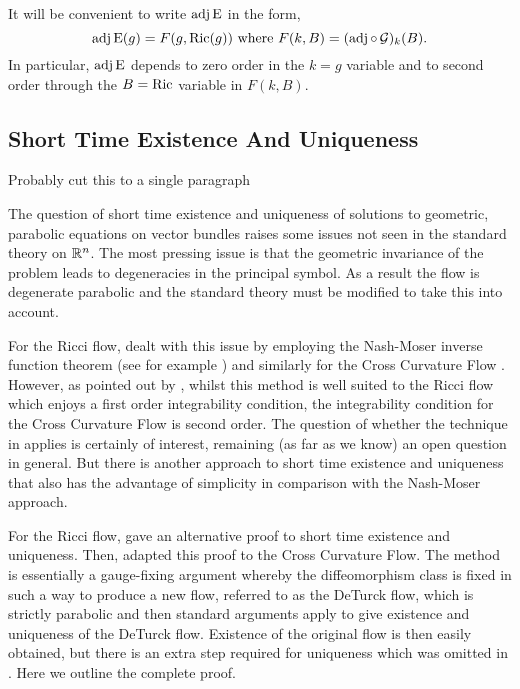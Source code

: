 \documentclass[a4paper, 12pt]{amsart}
\begin{document}
It will be convenient to write \(\operatorname{adj}\operatorname{E}\) in the form,
\begin{equation}
\label{eq:adjein_op}
\operatorname{adj}\operatorname{E} (g) = F(g, \operatorname{Ric}(g)) \text{ where } F(k, B) = (\operatorname{adj} \circ \operatorname{\mathcal{G}})_k (B).
\end{equation}
In particular, \(\operatorname{adj}\operatorname{E}\) depends to zero order in the \(k=g\) variable and to second order through the \(B = \operatorname{Ric}\) variable in \(F(k, B)\).

\subsection{Short Time Existence And Uniqueness}
\label{subsec:xcf_existence_uniqueness}

{\color{red} Probably cut this to a single paragraph}

The question of short time existence and uniqueness of solutions to geometric, parabolic equations on vector bundles raises some issues not seen in the standard theory on \(\mathbb{R}^n\). The most pressing issue is that the geometric invariance of the problem leads to degeneracies in the principal symbol. As a result the flow is degenerate parabolic and the standard theory must be modified to take this into account.

For the Ricci flow, \cite{Hamilton:/1982} dealt with this issue by employing the Nash-Moser inverse function theorem (see for example \cite{MR656198}) and similarly for the Cross Curvature Flow \cite{MR2055396}. However, as pointed out by \cite{MR2207496}, whilst this method is well suited to the Ricci flow which enjoys a first order integrability condition, the integrability condition for the Cross Curvature Flow is second order. The question of whether the technique in \cite{Hamilton:/1982} applies is certainly of interest, remaining (as far as we know) an open question in general. But there is another approach to short time existence and uniqueness that also has the advantage of simplicity in comparison with the Nash-Moser approach.

For the Ricci flow, \cite{MR697987} gave an alternative proof to short time existence and uniqueness. Then, \cite{MR2207496} adapted this proof to the Cross Curvature Flow. The method is essentially a gauge-fixing argument whereby the diffeomorphism class is fixed in such a way to produce a new flow, referred to as the DeTurck flow, which is strictly parabolic and then standard arguments apply to give existence and uniqueness of the DeTurck flow. Existence of the original flow is then easily obtained, but there is an extra step required for uniqueness which was omitted in \cite{MR2207496}. Here we outline the complete proof.
\end{document}
